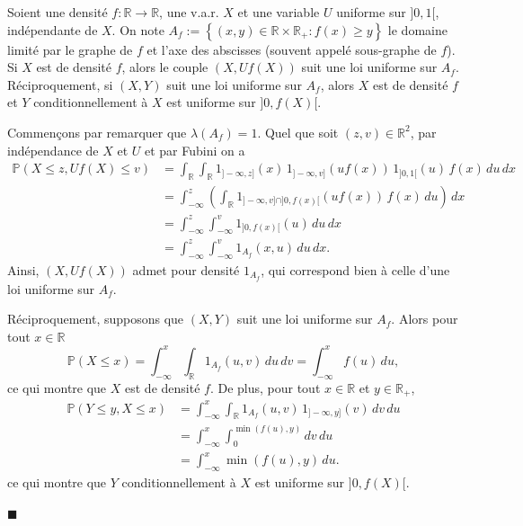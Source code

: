 \begin{proposition}\label{V-simunifdens}

Soient une densité \(f : \mathbb{R}\to \mathbb{R}\), une v.a.r. \(X\) et
une variable \(U\) uniforme sur \(]0,1[\), indépendante de \(X\). On
note
\(A_f := \left\{ (x,y) \in \mathbb{R}\times \mathbb{R}_+ : f(x) \geq y \right\}\)
le domaine limité par le graphe de \(f\) et l'axe des abscisses (souvent
appelé sous-graphe de \(f\)). Si \(X\) est de densité \(f\), alors le
couple \((X,Uf(X))\) suit une loi uniforme sur \(A_f\). Réciproquement, si \((X,Y)\) suit une loi uniforme sur \(A_f\), alors \(X\) est de densité \(f\) et \(Y\) conditionnellement à \(X\) est uniforme sur \(]0,f(X)[\).
\end{proposition}

\begin{preuve}
Commençons par remarquer que \(\lambda(A_f) = 1\). Quel que soit
\((z,v)\in\mathbb{R}^2\), par indépendance de \(X\) et \(U\) et par
Fubini on a \begin{align*}
\mathbb{P}\left( X \leq z, Uf(X) \leq v \right) &= \int_\mathbb{R}\int_\mathbb{R}1_{]-\infty,z]}(x)\,1_{]-\infty,v]}(uf(x))\,1_{]0,1[}(u)\,f(x)\,du\,dx\\
&= \int_{-\infty}^z \left(\int_\mathbb{R}1_{]-\infty,v]\cap ]0,f(x)[}(uf(x))\,f(x)\,du\right)\,dx\\
&= \int_{-\infty}^z \int_{-\infty}^v 1_{]0,f(x)[}(u)\,du\,dx\\
& = \int_{-\infty}^z \int_{-\infty}^v 1_{A_f}(x,u)\,du\,dx.
\end{align*} Ainsi, \((X,Uf(X))\) admet pour densité \(1_{A_f}\), qui
correspond bien à celle d'une loi uniforme sur
\(A_f\).

Réciproquement, supposons que \((X,Y)\) suit une loi uniforme sur
\(A_f\). Alors pour tout \(x\in\mathbb{R}\)
\[\mathbb{P}\left(X \leq x\right) = \int_{-\infty}^x \int_\mathbb{R} 1_{A_f}(u,v)\,du\,dv = \int_{-\infty}^x f(u)\,du,\] ce qui montre que \(X\) est de densité \(f\). De plus, pour tout \(x\in\mathbb{R}\) et \(y\in\mathbb{R}_+\),
\begin{align*}
\mathbb{P}\left(Y \leq y, X \leq x\right) 
&= \int_{-\infty}^x \int_\mathbb{R} 1_{A_f}(u,v)\,1_{]-\infty,y]}(v)\,dv\,du\\
&= \int_{-\infty}^x \int_0^{\min(f(u),y)} dv\,du\\
&= \int_{-\infty}^x \min(f(u),y)\,du.
\end{align*}
ce qui montre que \(Y\) conditionnellement à \(X\) est uniforme sur \(]0,f(X)[\).

\hfill$\blacksquare$
\end{preuve}

